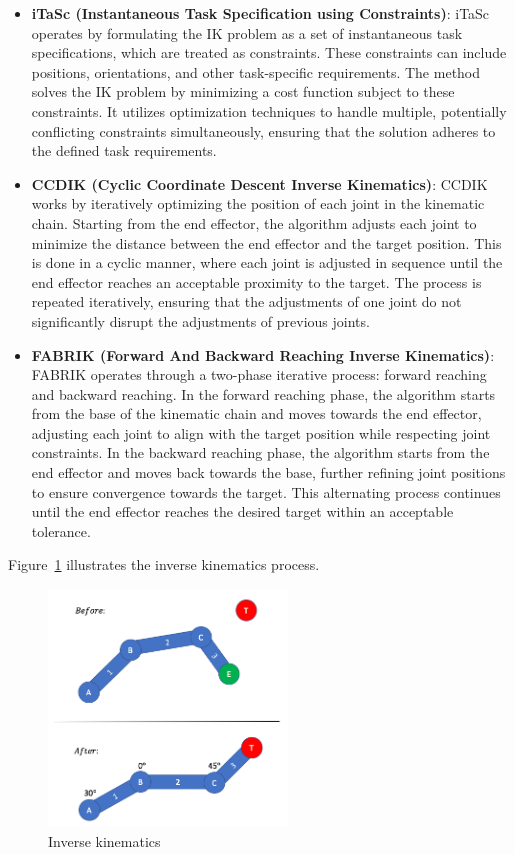 \documentclass[../../main.tex]{subfiles}
\begin{document}
\begin{itemize} 
  \item \textbf{iTaSc (Instantaneous Task Specification using Constraints)}: iTaSc\cite{4648032} operates by formulating the IK problem as a set of instantaneous task specifications, which are treated as constraints. These constraints can include positions, orientations, and other task-specific requirements. The method solves the IK problem by minimizing a cost function subject to these constraints. It utilizes optimization techniques to handle multiple, potentially conflicting constraints simultaneously, ensuring that the solution adheres to the defined task requirements.

  \item \textbf{CCDIK (Cyclic Coordinate Descent Inverse Kinematics)}: CCDIK\cite{kenwright2012inverse} works by iteratively optimizing the position of each joint in the kinematic chain. Starting from the end effector, the algorithm adjusts each joint to minimize the distance between the end effector and the target position. This is done in a cyclic manner, where each joint is adjusted in sequence until the end effector reaches an acceptable proximity to the target. The process is repeated iteratively, ensuring that the adjustments of one joint do not significantly disrupt the adjustments of previous joints.

  \item \textbf{FABRIK (Forward And Backward Reaching Inverse Kinematics)}: FABRIK\cite{aristidou2011fabrik} operates through a two-phase iterative process: forward reaching and backward reaching. In the forward reaching phase, the algorithm starts from the base of the kinematic chain and moves towards the end effector, adjusting each joint to align with the target position while respecting joint constraints. In the backward reaching phase, the algorithm starts from the end effector and moves back towards the base, further refining joint positions to ensure convergence towards the target. This alternating process continues until the end effector reaches the desired target within an acceptable tolerance.
\end{itemize}

Figure~\ref{fig:inverse_kinematics_example} illustrates the inverse kinematics process.

\begin{figure} 
  \centering \includegraphics[width = 2.5in]{chapters/background_work/images/inverse_kinematics_example.png} 
  \caption{Inverse kinematics} 
  \label{fig:inverse_kinematics_example} 
\end{figure}
\end{document}
